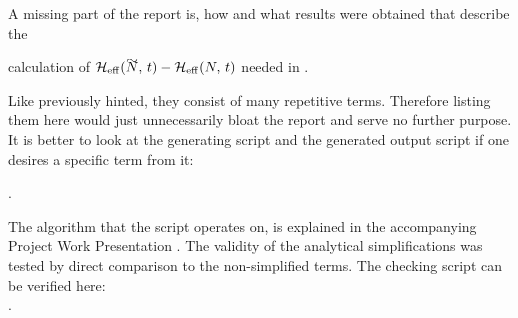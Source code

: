 A missing part of the report is, how and what results were obtained that describe the 

 calculation of $\HeffOft[\vphantom{N}\smash{\tilde{N}}]-\HeffOft[N]$ needed in .

Like previously hinted, they consist of many repetitive terms.
Therefore listing them here would just unnecessarily bloat the report and serve no further purpose.
It is better to look at the generating script 
and the generated output script if one desires a specific term from it:

.

The algorithm that the script operates on, is explained in the accompanying Project Work Presentation  \cite{selfDocument}.
The validity of the analytical simplifications was tested by direct comparison to the non-simplified terms.
The checking script can be verified here:\\
.